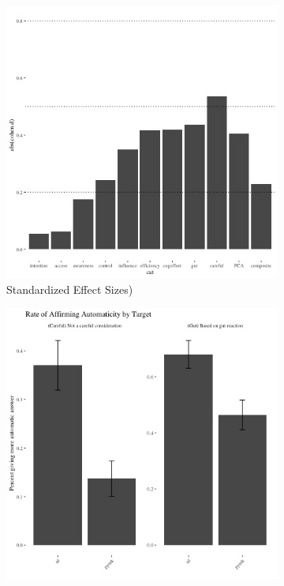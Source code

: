 \documentclass[12pt,letterpaper]{article}
\begin{document}
\begin{figure}
    \begin{subfigure}{.5\textwidth} 
        \centering
        \includegraphics[width=1\linewidth]{Output/Graphs/Experiments/Automaticity/standardized effect sizes.jpg} 
        \caption{Standardized Effect Sizes)}
        \label{fig:sub-first}
    \end{subfigure}
    \begin{subfigure}{.5\textwidth} 
        \centering
        \includegraphics[width=1\linewidth]{Output/Graphs/Experiments/Automaticity/bar chart binary measures.jpg} 

\end{subfigure}
\end{figure}
\end{document}
